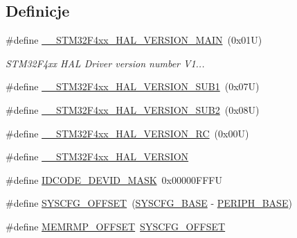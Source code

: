 \subsection*{Definicje}
\begin{DoxyCompactItemize}
\item 
\#define \hyperlink{group___h_a_l___private___constants_gadaedd4f6c52f98c7a4ba371ec551b6ce}{\+\_\+\+\_\+\+S\+T\+M32\+F4xx\+\_\+\+H\+A\+L\+\_\+\+V\+E\+R\+S\+I\+O\+N\+\_\+\+M\+A\+IN}~(0x01\+U)
\begin{DoxyCompactList}\small\item\em S\+T\+M32\+F4xx H\+AL Driver version number V1... \end{DoxyCompactList}\item 
\#define \hyperlink{group___h_a_l___private___constants_ga9d5e3917a3f5a417be6c8423faf78f0e}{\+\_\+\+\_\+\+S\+T\+M32\+F4xx\+\_\+\+H\+A\+L\+\_\+\+V\+E\+R\+S\+I\+O\+N\+\_\+\+S\+U\+B1}~(0x07\+U)
\item 
\#define \hyperlink{group___h_a_l___private___constants_ga87b379595edcc7d72d78b2263ae08dee}{\+\_\+\+\_\+\+S\+T\+M32\+F4xx\+\_\+\+H\+A\+L\+\_\+\+V\+E\+R\+S\+I\+O\+N\+\_\+\+S\+U\+B2}~(0x08\+U)
\item 
\#define \hyperlink{group___h_a_l___private___constants_ga61fad66d665ed89f1227e459e480e28b}{\+\_\+\+\_\+\+S\+T\+M32\+F4xx\+\_\+\+H\+A\+L\+\_\+\+V\+E\+R\+S\+I\+O\+N\+\_\+\+RC}~(0x00\+U)
\item 
\#define \hyperlink{group___h_a_l___private___constants_ga2e012cfb937fbdfa71a0c0c83f2db5b3}{\+\_\+\+\_\+\+S\+T\+M32\+F4xx\+\_\+\+H\+A\+L\+\_\+\+V\+E\+R\+S\+I\+ON}
\item 
\#define \hyperlink{group___h_a_l___private___constants_gaeeece10cca80f3c632d3d77c3f2917b6}{I\+D\+C\+O\+D\+E\+\_\+\+D\+E\+V\+I\+D\+\_\+\+M\+A\+SK}~0x00000\+F\+F\+FU
\item 
\#define \hyperlink{group___h_a_l___private___constants_ga13f7abe3641989d4d063ad21962da8b0}{S\+Y\+S\+C\+F\+G\+\_\+\+O\+F\+F\+S\+ET}~(\hyperlink{group___peripheral__memory__map_ga62246020bf3b34b6a4d8d0e84ec79d3d}{S\+Y\+S\+C\+F\+G\+\_\+\+B\+A\+SE} -\/ \hyperlink{group___peripheral__memory__map_ga9171f49478fa86d932f89e78e73b88b0}{P\+E\+R\+I\+P\+H\+\_\+\+B\+A\+SE})
\item 
\#define \hyperlink{group___h_a_l___private___constants_ga7f801653c361f31380f21357f92dc9af}{M\+E\+M\+R\+M\+P\+\_\+\+O\+F\+F\+S\+ET}~\hyperlink{group___h_a_l___private___constants_ga13f7abe3641989d4d063ad21962da8b0}{S\+Y\+S\+C\+F\+G\+\_\+\+O\+F\+F\+S\+ET}
\item 

\end{DoxyCompactItemize}

